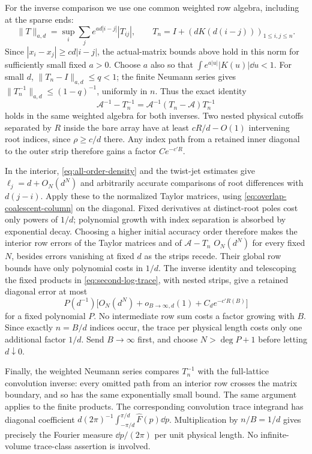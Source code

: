 For the inverse comparison we use one common weighted row algebra,
including at the sparse ends:
\begin{equation}\label{eq:overlap-common-row-norm}
 \|T\|_{a,d}=\sup_i\sum_j e^{ad|i-j|}|T_{ij}|,
 \qquad T_n=I+(dK(d(i-j)))_{1\le i,j\le n}.
\end{equation}
Since \(|x_i-x_j|\ge cd|i-j|\), the actual-matrix bounds above hold
in this norm for sufficiently small fixed \(a>0\).
Choose \(a\) also so that \(\int e^{a|u|}|K(u)|\dd u<1\).
For small \(d\), \(\|T_n-I\|_{a,d}\le q<1\); the finite Neumann
series gives \(\|T_n^{-1}\|_{a,d}\le(1-q)^{-1}\), uniformly in \(n\).
Thus the exact identity
\[
 \mathcal A^{-1}-T_n^{-1}
       =\mathcal A^{-1}(T_n-\mathcal A)T_n^{-1}
\]
holds in the same weighted algebra for both inverses.
Two nested physical cutoffs separated by \(R\) inside the bare array
have at least \(cR/d-O(1)\) intervening root indices, since
\(\rho\ge c/d\) there. Any index path from a retained inner diagonal
to the outer strip therefore gains a factor \(Ce^{-c'R}\).

In the interior, \eqref{eq:all-order-density} and the twist-jet
estimates give \(\ell_j=d+O_N(d^N)\) and arbitrarily accurate
comparisons of root differences with \(d(j-i)\).
Apply these to the normalized Taylor matrices, using
\eqref{eq:overlap-coalescent-column} on the diagonal.
Fixed derivatives at distinct-root poles cost only powers of \(1/d\);
polynomial growth with index separation is absorbed by exponential
decay. Choosing a higher initial accuracy order therefore makes the
interior row errors of the Taylor matrices and of
\(\mathcal A-T_n\) \(O_N(d^N)\) for every fixed \(N\), besides errors
vanishing at fixed \(d\) as
the strips recede. Their global row bounds have only polynomial
costs in \(1/d\). The inverse identity and telescoping the fixed
products in \eqref{eq:second-log-trace}, with nested strips, give a
retained diagonal error at most
\[
 P(d^{-1})\bigl[O_N(d^N)+o_{B\to\infty,d}(1)+C_de^{-c'R(B)}\bigr]
\]
for a fixed polynomial \(P\). No intermediate row sum costs a factor
growing with \(B\). Since exactly \(n=B/d\) indices occur, the trace
per physical length costs only one additional factor \(1/d\).
Send \(B\to\infty\) first, and choose \(N>\deg P+1\) before
letting \(d\downarrow0\).

Finally, the weighted Neumann series compares \(T_n^{-1}\) with the
full-lattice convolution inverse: every omitted path from an interior
row crosses the matrix boundary, and so has the same exponentially
small bound. The same argument applies to the finite products.
The corresponding convolution trace integrand has
diagonal coefficient \(d(2\pi)^{-1}\int_{-\pi/d}^{\pi/d}
\widehat F(p)\dd p\). Multiplication by \(n/B=1/d\) gives precisely
the Fourier measure \(\dd p/(2\pi)\) per unit physical length.
No infinite-volume trace-class assertion is involved.

